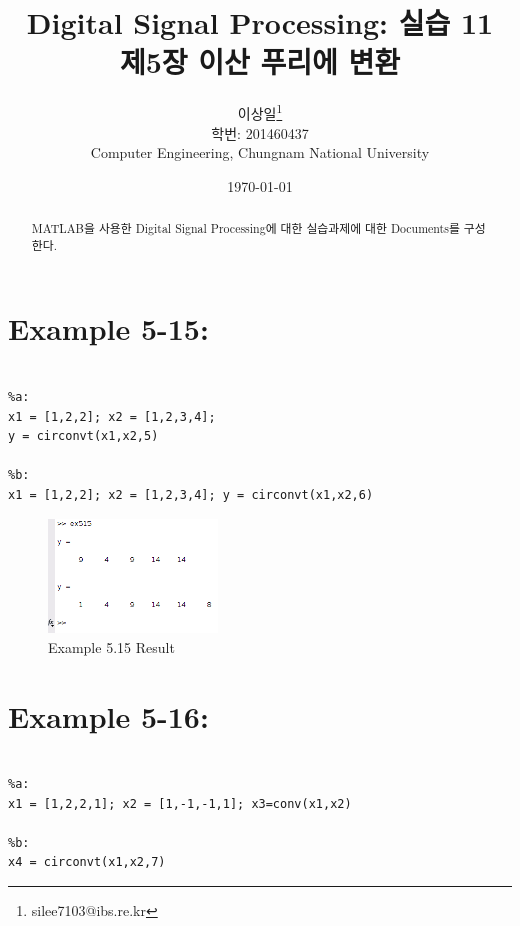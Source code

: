 \documentclass[11pt
  , a4paper
  , article
  , oneside
]{memoir}
\begin{document}
\newcommand{\technumber}{
  Digital Signal Processing using MATLAB}
\title{\textbf{Digital Signal Processing: 실습 11 \\
		제5장 이산 푸리에 변환 \\}}

\author{이상일\thanks{silee7103@ibs.re.kr} \\

  학번: 201460437\\
  Computer Engineering, Chungnam National University 
}
\date{\today}

\renewcommand{\maketitlehooka}{\begin{flushright}\textsf{\technumber}\end{flushright}}

\maketitle

\begin{abstract}
MATLAB을 사용한 Digital Signal Processing에 대한 실습과제에 대한 Documents를 구성한다.
\end{abstract}


\chapter{Example 5-15:}

\begin{lstlisting}[style=termstyle]
% Example 05.15

%a:
x1 = [1,2,2]; x2 = [1,2,3,4]; 
y = circonvt(x1,x2,5)

%b:
x1 = [1,2,2]; x2 = [1,2,3,4]; y = circonvt(x1,x2,6)
\end{lstlisting}

\begin{figure}[h!]
	\centering
	\includegraphics[width=0.4\textwidth,height=0.2\textwidth]{./images/ex515.png}
	\caption{Example 5.15 Result}
	\label{fig:Example 5.15 Result}
\end{figure}

\chapter{Example 5-16:}
\begin{lstlisting}[style=termstyle]
% Example 05.16

%a:
x1 = [1,2,2,1]; x2 = [1,-1,-1,1]; x3=conv(x1,x2)

%b:
x4 = circonvt(x1,x2,7)
\end{lstlisting}
\end{document}
